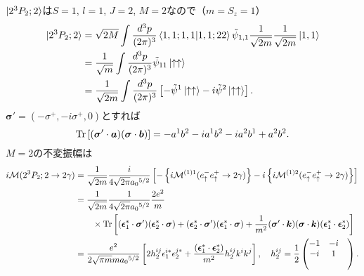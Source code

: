 $\ket{2^3P_2;2}$は$S=1$, $l=1$, $J=2$, $M=2$なので（$m=S_z=1$）
\begin{align*}
  \ket{2^3P_2;2} &= \sqrt{2M} \int \frac{d^3p}{(2\pi)^3}
  \braket{1,1; 1,1 | 1,1; 22} \tilde{\psi}_{1,1} \frac{1}{\sqrt{2m}}\frac{1}{\sqrt{2m}} \ket{1, 1} \\
  &= \frac{1}{\sqrt{m}} \int \frac{d^3p}{(2\pi)^3} \tilde{\psi}_{11} \ket{\uparrow\uparrow} \\
  &= \frac{1}{\sqrt{2m}} \int \frac{d^3p}{(2\pi)^3} \left[ - \tilde\psi^1 \ket{\uparrow\uparrow} - i \tilde\psi^2 \ket{\uparrow\uparrow} \right] .
\end{align*}
$\boldsymbol\sigma' = (- \sigma^+, -i\sigma^+, 0)$とすれば
\[ \operatorname{Tr} \left[ (\boldsymbol\sigma' \cdot \boldsymbol{a}) (\boldsymbol\sigma \cdot \boldsymbol{b}) \right] = - a^1b^2 - i a^1b^2 - i a^2b^1 + a^2b^2 . \]
$M=2$の不変振幅は
\begin{align*}
  i\mathcal{M}(2^3P_2;2 \to 2\gamma) &= \frac{1}{\sqrt{2m}} \frac{i}{4\sqrt{2\pi} a_0{}^{5/2}}
  \left[ - \left\{ i\mathcal{M}^{(1)1}(e^-_\uparrow e^+_\uparrow \to 2\gamma) \right\}
  - i \left\{ i\mathcal{M}^{(1)2}(e^-_\uparrow e^+_\uparrow \to 2\gamma) \right\} \right] \\
  &= \frac{1}{\sqrt{2m}} \frac{1}{4\sqrt{2\pi} a_0{}^{5/2}} \frac{2e^2}{m} \\
  & \qquad \times \operatorname{Tr} \left[ (\boldsymbol{\epsilon}_1^\ast \cdot \boldsymbol\sigma') (\boldsymbol{\epsilon}_2^\ast \cdot \boldsymbol\sigma)
  + (\boldsymbol{\epsilon}_2^\ast \cdot \boldsymbol\sigma')(\boldsymbol{\epsilon}_1^\ast \cdot \boldsymbol\sigma)
  + \frac{1}{m^2} (\boldsymbol\sigma' \cdot \boldsymbol{k})(\boldsymbol\sigma \cdot \boldsymbol{k})(\boldsymbol{\epsilon}_1^\ast \cdot \boldsymbol{\epsilon}_2^\ast) \right] \\
  &= \frac{e^2}{2\sqrt{\pi m}m a_0{}^{5/2}} \left[ 2h_2^{ij} \epsilon_1^{i\ast} \epsilon_2^{j\ast}
  + \frac{(\boldsymbol{\epsilon}_1^\ast \cdot \boldsymbol{\epsilon}_2^\ast)}{m^2} h_2^{ij} k^ik^j \right] , \quad
  h_2^{ij} = \frac{1}{2}
  \begin{pmatrix}
    -1 & -i & \\
    -i & 1 & \\
    & &
  \end{pmatrix}
  .
\end{align*}

